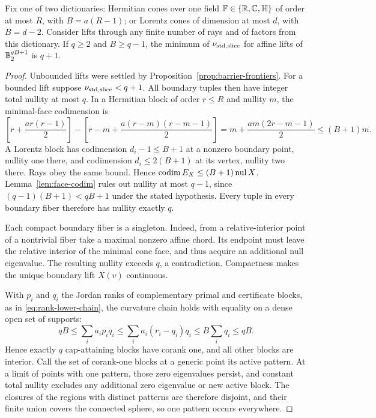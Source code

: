\begin{theorem}\label{thm:wide-cap}
Fix one of two dictionaries: Hermitian cones over one field
$\mathbb F\in\{\mathbb R,\mathbb C,\mathbb H\}$ of order at most $R$, with $B=a(R-1)$;
or Lorentz cones of dimension at most $d$, with $B=d-2$. Consider
lifts through any finite number of rays and of factors from this
dictionary. If $q\geq2$ and
$B\geq q-1$, the minimum of $\nu_{\mathrm{std},\mathrm{slice}}$ for affine lifts of
$\mathbb B_2^{qB+1}$ is $q+1$.
\end{theorem}
\begin{proof}
Unbounded lifts were settled by Proposition~\ref{prop:barrier-frontiers}.
For a bounded lift suppose $\nu_{\mathrm{std},\mathrm{slice}}<q+1$. All boundary tuples then have
integer total nullity at most $q$. In a Hermitian block of order $r\leq R$
and nullity $m$, the minimal-face codimension is
\[
 \left[r+\frac{ar(r-1)}2\right]
 -\left[r-m+\frac{a(r-m)(r-m-1)}2\right]
 =m+\frac{am(2r-m-1)}2\leq(B+1)m.
\]
A Lorentz block has codimension $d_i-1\leq B+1$ at a nonzero boundary
point, nullity one there, and codimension $d_i\leq2(B+1)$ at its
vertex, nullity two there. Rays obey the same bound. Hence
$\operatorname{codim} E_X\leq(B+1)\operatorname{nul}X$.
Lemma~\ref{lem:face-codim} rules out nullity at most $q-1$, since
$(q-1)(B+1)<qB+1$ under the stated hypothesis. Every tuple in every
boundary fiber therefore has nullity exactly $q$.

Each compact boundary fiber is a singleton. Indeed, from a
relative-interior point of a nontrivial fiber take a maximal nonzero
affine chord. Its endpoint must leave the relative interior of the
minimal cone face, and thus acquire an additional null eigenvalue.
The resulting nullity exceeds $q$, a contradiction. Compactness makes
the unique boundary lift $X(v)$ continuous.

With $p_i$ and $q_i$ the Jordan ranks of complementary primal and
certificate blocks, as in \eqref{eq:rank-lower-chain}, the curvature
chain holds with equality on a dense open set of supports:
\[
 qB\leq\sum_i a_ip_iq_i\leq
 \sum_i a_i(r_i-q_i)q_i\leq B\sum_iq_i\leq qB.
\]
Hence exactly $q$ cap-attaining blocks have corank one, and all other
blocks are interior. Call the set of corank-one blocks at a generic
point its active pattern. At a limit of points with one pattern, those
zero eigenvalues persist, and constant total nullity excludes any
additional zero eigenvalue or new active block. The closures of the
regions with distinct patterns are therefore disjoint, and their finite
union covers the connected sphere, so one pattern occurs everywhere.


\end{proof}
